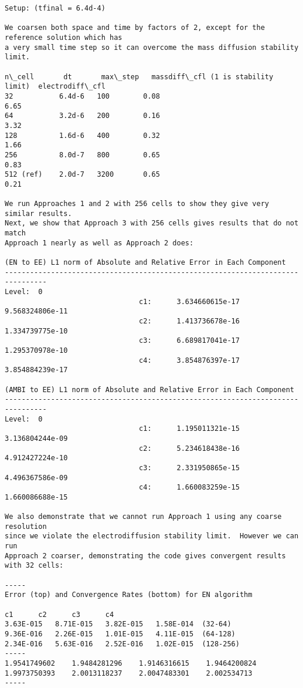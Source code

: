 \documentclass[final]{siamltex}
\begin{document}
\begin{verbatim}
Setup: (tfinal = 6.4d-4)

We coarsen both space and time by factors of 2, except for the reference solution which has
a very small time step so it can overcome the mass diffusion stability limit.

n\_cell       dt       max\_step   massdiff\_cfl (1 is stability limit)  electrodiff\_cfl
32           6.4d-6   100        0.08                                 6.65
64           3.2d-6   200        0.16                                 3.32
128          1.6d-6   400        0.32                                 1.66
256          8.0d-7   800        0.65                                 0.83
512 (ref)    2.0d-7   3200       0.65                                 0.21

We run Approaches 1 and 2 with 256 cells to show they give very similar results.
Next, we show that Approach 3 with 256 cells gives results that do not match
Approach 1 nearly as well as Approach 2 does:

(EN to EE) L1 norm of Absolute and Relative Error in Each Component
--------------------------------------------------------------------------------
Level:  0
                                c1:      3.634660615e-17     9.568324806e-11
                                c2:      1.413736678e-16     1.334739775e-10
                                c3:      6.689817041e-17     1.295370978e-10
                                c4:      3.854876397e-17     3.854884239e-17

(AMBI to EE) L1 norm of Absolute and Relative Error in Each Component
--------------------------------------------------------------------------------
Level:  0
                                c1:      1.195011321e-15     3.136804244e-09
                                c2:      5.234618438e-16     4.912427224e-10
                                c3:      2.331950865e-15     4.496367586e-09
                                c4:      1.660083259e-15     1.660086688e-15

We also demonstrate that we cannot run Approach 1 using any coarse resolution
since we violate the electrodiffusion stability limit.  However we can run
Approach 2 coarser, demonstrating the code gives convergent results with 32 cells:

-----
Error (top) and Convergence Rates (bottom) for EN algorithm

c1		c2		c3		c4
3.63E-015	8.71E-015	3.82E-015	1.58E-014  (32-64)
9.36E-016	2.26E-015	1.01E-015	4.11E-015  (64-128)
2.34E-016	5.63E-016	2.52E-016	1.02E-015  (128-256)
-----
1.9541749602	1.9484281296	1.9146316615	1.9464200824
1.9973750393	2.0013118237	2.0047483301	2.002534713
-----


\end{verbatim}
\end{document}

